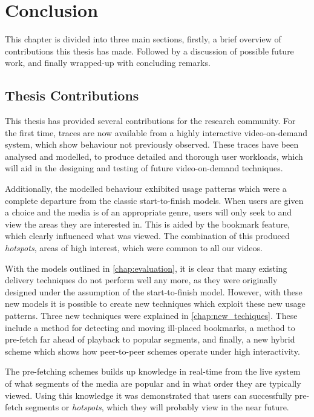 \chapter{Conclusion}
\label{chap:conclusion}

This chapter is divided into three main sections, firstly, a brief overview of contributions this thesis has made. Followed by a discussion of possible future work, and finally wrapped-up with concluding remarks.

\section{Thesis Contributions}

    This thesis has provided several contributions for the research community. For the first time, traces are now available from a highly interactive video-on-demand system, which show behaviour not previously observed. These traces have been analysed and modelled, to produce detailed and thorough user workloads, which will aid in the designing and testing of future video-on-demand techniques.

    Additionally, the modelled behaviour exhibited usage patterns which were a complete departure from the classic start-to-finish models. When users are given a choice and the media is of an appropriate genre, users will only seek to and view the areas they are interested in. This is aided by the bookmark feature, which clearly influenced what was viewed. The combination of this produced \emph{hotspots}, areas of high interest, which were common to all our videos.

    With the models outlined in \autoref{chap:evaluation}, it is clear that many existing delivery techniques do not perform well any more, as they were originally designed under the assumption of the start-to-finish model. However, with these new models it is possible to create new techniques which exploit these new usage patterns. Three new techniques were explained in \autoref{chap:new_techiques}.  These include a method for detecting and moving ill-placed bookmarks, a method to pre-fetch far ahead of playback to popular segments, and finally, a new hybrid scheme which shows how peer-to-peer schemes operate under high interactivity.

    The pre-fetching schemes builds up knowledge in real-time from the live system of what segments of the media are popular and in what order they are typically viewed. Using this knowledge it was demonstrated that users can successfully pre-fetch segments or \emph{hotspots}, which they will probably view in the near future.

